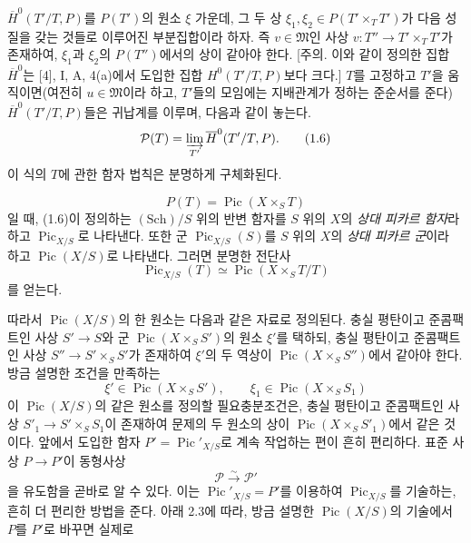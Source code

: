 \documentclass[11pt,twoside,openany]{book}
\numberwithin{equation}{section}
\newcommand{\sourceunit}{front}
\newcommand{\src}[1]{%
  \phantomsection\hypertarget{src:\sourceunit:#1}{}%
  \marginpar{\raggedleft\footnotesize\sffamily #1}%
}
\theoremstyle{plain}
\theoremstyle{definition}
\theoremstyle{remark}
\begin{document}
\src{145}
$\overline H^0(T'/T,P)$를 $P(T')$의 원소 $\xi$ 가운데, 그 두 상
$\xi_1,\xi_2\in P(T'\times_TT')$가 다음 성질을 갖는 것들로 이루어진
부분집합이라 하자. 즉 $v\in\mathfrak M$인 사상
$v:T''\longrightarrow T'\times_TT'$가 존재하여, $\xi_1$과 $\xi_2$의
$P(T'')$에서의 상이 같아야 한다. [주의. 이와 같이 정의한 집합
$\overline H^0$는 [4], I, A, 4(a)에서 도입한 집합 $H^0(T'/T,P)$보다
크다.] $T$를 고정하고 $T'$을 움직이면(여전히 $u\in\mathfrak M$이라
하고, $T'$들의 모임에는 지배관계가 정하는 준순서를 준다)
$\overline H^0(T'/T,P)$들은 귀납계를 이루며, 다음과 같이 놓는다.
\begin{equation}
\mathcal P(T)=\varinjlim_{T'}\overline H^0(T'/T,P).
\tag{1.6}
\end{equation}
이 식의 $T$에 관한 함자 법칙은 분명하게 구체화된다.

\[
P(T)=\operatorname{Pic}(X\times_ST)
\]
일 때, (1.6)이 정의하는 $(\mathrm{Sch})/S$ 위의 반변 함자를 $S$ 위의
$X$의 \emph{상대 피카르 함자}라 하고 $\operatorname{Pic}_{X/S}$로
나타낸다. 또한 군 $\operatorname{Pic}_{X/S}(S)$를 $S$ 위의 $X$의
\emph{상대 피카르 군}이라 하고 $\operatorname{Pic}(X/S)$로 나타낸다.
그러면 분명한 전단사
\begin{equation}
\operatorname{Pic}_{X/S}(T)\simeq\operatorname{Pic}(X\times_ST/T)
\tag{1.7}
\end{equation}
를 얻는다.

따라서 $\operatorname{Pic}(X/S)$의 한 원소는 다음과 같은 자료로
정의된다. 충실 평탄이고 준콤팩트인 사상 $S'\longrightarrow S$와 군
$\operatorname{Pic}(X\times_SS')$의 원소 $\xi'$를 택하되, 충실 평탄이고
준콤팩트인 사상 $S''\longrightarrow S'\times_SS'$가 존재하여 $\xi'$의
두 역상이 $\operatorname{Pic}(X\times_SS'')$에서 같아야 한다. 방금
설명한 조건을 만족하는
\[
\xi'\in\operatorname{Pic}(X\times_SS'),\qquad
\xi_1\in\operatorname{Pic}(X\times_SS_1)
\]
이 $\operatorname{Pic}(X/S)$의 같은 원소를 정의할 필요충분조건은,
충실 평탄이고 준콤팩트인 사상
$S'_1\longrightarrow S'\times_SS_1$이 존재하여 문제의 두 원소의 상이
$\operatorname{Pic}(X\times_SS'_1)$에서 같은 것이다. 앞에서 도입한 함자
$P'=\operatorname{Pic}'_{X/S}$로 계속 작업하는 편이 흔히 편리하다.
표준 사상 $P\longrightarrow P'$이 동형사상
\begin{equation}
\mathcal P\xrightarrow{\sim}\mathcal P'
\tag{1.8}
\end{equation}
을 유도함을 곧바로 알 수 있다. 이는
$\operatorname{Pic}'_{X/S}=P'$를 이용하여
$\operatorname{Pic}_{X/S}$를 기술하는, 흔히 더 편리한 방법을 준다. 아래
2.3에 따라, 방금 설명한 $\operatorname{Pic}(X/S)$의 기술에서 $P$를
$P'$로 바꾸면 실제로
\end{document}
